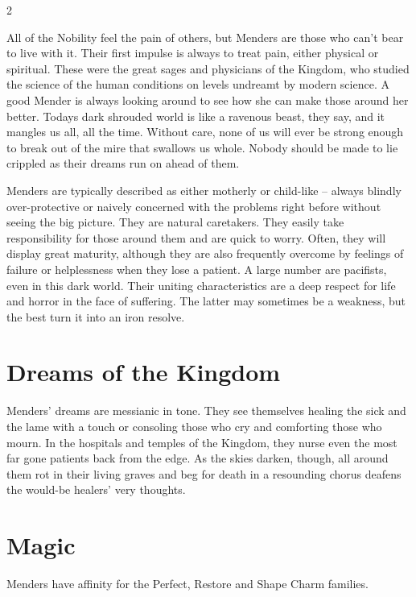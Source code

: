 \label{scha:Mender}\begin{multicols}{2}\raggedcolumns

\noindent All of the Nobility feel the pain of others, but Menders are those who can't bear to live with it. Their first impulse is always to treat pain, either physical or spiritual. These were the great sages and physicians of the Kingdom, who studied the science of the human conditions on levels undreamt by modern science. A good Mender is always looking around to see how she can make those around her better. Todays dark shrouded world is like a ravenous beast, they say, and it mangles us all, all the time. Without care, none of us will ever be strong enough to break out of the mire that swallows us whole. Nobody should be made to lie crippled as their dreams run on ahead of them.

Menders are typically described as either motherly or child-like – always blindly over-protective or naively concerned with the problems right before without seeing the big picture. They are natural caretakers. They easily take responsibility for those around them and are quick to worry. Often, they will display great maturity, although they are also frequently overcome by feelings of failure or helplessness when they lose a patient. A large number are pacifists, even in this dark world. Their uniting characteristics are a deep respect for life and horror in the face of suffering. The latter may sometimes be a weakness, but the best turn it into an iron resolve. 

\section*{Dreams of the Kingdom}

Menders' dreams are messianic in tone. They see themselves healing the sick and the lame with a touch or consoling those who cry and comforting those who mourn. In the hospitals and temples of the Kingdom, they nurse even the most far gone patients back from the edge. As the skies darken, though, all around them rot in their living graves and beg for death in a resounding chorus deafens the would-be healers' very thoughts. 

\section*{Magic}

Menders have affinity for the Perfect, Restore and Shape Charm families.


\end{multicols}
